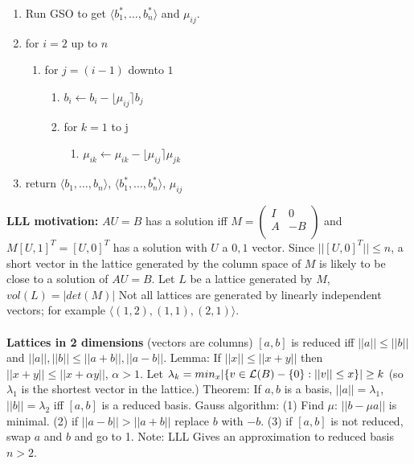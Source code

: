 \begin{enumerate}
\item Run GSO to get $\langle b_1^* , \ldots , b_n^* \rangle$ and $\mu_{ij}$.
\item for $i=2$ up to $n$
\begin{enumerate}[label*=\arabic*.]
\item for $j=(i-1)$ downto $1$
\begin{enumerate}[label*=\arabic*.]
\item $b_i \leftarrow b_i - \lfloor \mu_{ij} \rceil b_j$
\item for $k=1$ to j
\begin{enumerate}[label*=\arabic*.]
\item $\mu_{ik} \leftarrow \mu_{ik} - \lfloor \mu_{ij} \rceil \mu_{jk}$
\end{enumerate}
\end{enumerate}
\end{enumerate}
\item return $\langle b_1 , \ldots , b_n \rangle$, $\langle b_1^* , \ldots , b_n^* \rangle$, $\mu_{ij}$
\end{enumerate}
{\bf LLL motivation:}  $AU=B$ has a solution iff
$M=
\left (
\begin{array}{cc}
I & 0\\
A & -B\\
\end{array}
\right)$ and $M [U,1]^T = [U,0]^T$ has a solution with $U$ a $0,1$ vector.  Since
$||[U, 0]^T || \leq n$, a short vector in the lattice generated by the column
space of $M$ is likely to be close to a solution of $AU=B$.  Let $L$ be a
lattice generated by $M$, $vol(L)= |det(M)|$   Not all lattices are generated
by linearly independent vectors; for example $\langle (1,2), (1,1), (2,1) \rangle$.
\\
\\
{\bf Lattices in 2 dimensions} (vectors are columns)  $[a, b]$ is reduced iff
$||a|| \leq ||b||$ and $||a||, ||b|| \leq ||a+b||, ||a-b||$.
Lemma: If $||x|| \leq ||x+y||$ then $||x+y|| \leq ||x+ \alpha y||$, $\alpha > 1$.
Let $\lambda_k = min_{x} |\{ v \in {\cal L}(B)-\{0\} : ||v|| \leq x\}| \geq k$
(so $\lambda_1$ is the shortest
vector in the lattice.)
Theorem: If $a, b$ is a basis, $||a|| = \lambda_1$, $||b||= \lambda_2$ iff $[a, b]$
is a reduced basis.
Gauss algorithm: (1) Find $\mu$: $||b-\mu a||$ is minimal.  
(2) if $||a-b||>||a+b||$ replace
$b$ with $-b$. (3) if $[a, b]$ is not reduced, swap $a$ and $b$ and go to 1.
Note: LLL Gives an approximation to reduced basis $n>2$.  \\
